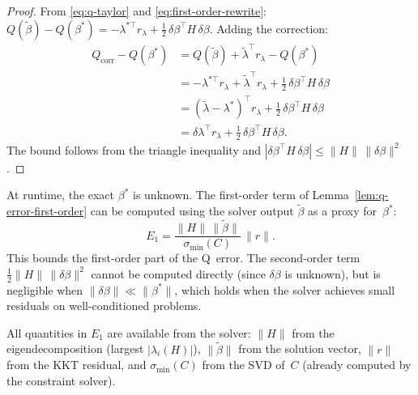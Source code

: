 \begin{proof}
From \eqref{eq:q-taylor} and \eqref{eq:first-order-rewrite}:
$Q(\tilde\beta) - Q(\beta^*) = -\lambda^{*\top} r_\lambda
+ \tfrac{1}{2}\,\delta\beta^\top H\,\delta\beta$. Adding the correction:
\begin{align*}
  Q_{\mathrm{corr}} - Q(\beta^*)
  &= Q(\tilde\beta) + \tilde\lambda^\top r_\lambda - Q(\beta^*) \\
  &= -\lambda^{*\top} r_\lambda + \tilde\lambda^\top r_\lambda
    + \tfrac{1}{2}\,\delta\beta^\top H\,\delta\beta \\
  &= (\tilde\lambda - \lambda^*)^\top r_\lambda
    + \tfrac{1}{2}\,\delta\beta^\top H\,\delta\beta \\
  &= \delta\lambda^\top r_\lambda
    + \tfrac{1}{2}\,\delta\beta^\top H\,\delta\beta.
\end{align*}
The bound follows from the triangle inequality and
$|\delta\beta^\top H\,\delta\beta| \leq \|H\|\,\|\delta\beta\|^2$.
\end{proof}


\begin{remark}\label{rem:runtime-q-bound}
At runtime, the exact $\beta^*$ is unknown.
The first-order term of Lemma~\ref{lem:q-error-first-order}
can be computed using the solver output $\tilde\beta$
as a proxy for~$\beta^*$:
\[
  E_1 = \frac{\|H\|\,\|\tilde\beta\|}{\sigma_{\min}(C)}\,\|r\|.
\]
This bounds the first-order part of the Q~error.
The second-order term $\tfrac{1}{2}\|H\|\,\|\delta\beta\|^2$
cannot be computed directly (since $\delta\beta$ is unknown),
but is negligible when $\|\delta\beta\| \ll \|\beta^*\|$,
which holds when the solver achieves small residuals on
well-conditioned problems.


All quantities in $E_1$ are available from the solver:
$\|H\|$ from the eigendecomposition (largest $|\lambda_i(H)|$),
$\|\tilde\beta\|$ from the solution vector,
$\|r\|$ from the KKT residual, and
$\sigma_{\min}(C)$ from the SVD of~$C$
(already computed by the constraint solver).

\end{remark}


